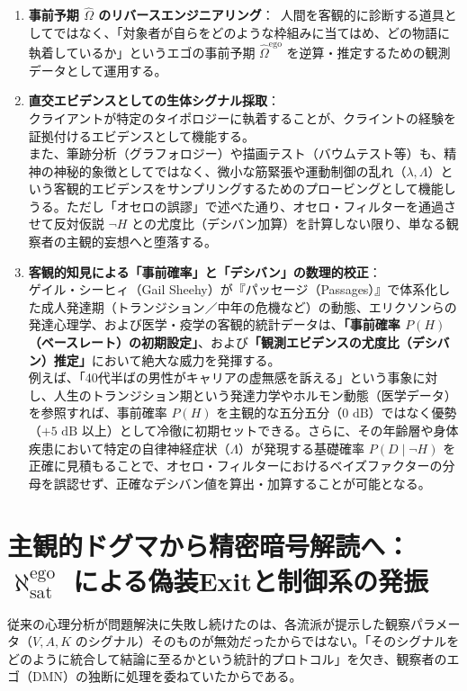 \begin{enumerate}[label=(\arabic*)]
\item \textbf{事前予期 $\hat{\Omega}$ のリバースエンジニアリング}：\
人間を客観的に診断する道具としてではなく、「対象者が自らをどのような枠組みに当てはめ、どの物語に執着しているか」というエゴの事前予期 $\hat{\Omega}^{\mathrm{ego}}$ を逆算・推定するための観測データとして運用する。

\item \textbf{直交エビデンスとしての生体シグナル採取}：\\
クライアントが特定のタイポロジーに執着することが、クライントの経験を証拠付けるエビデンスとして機能する。 \\
また、筆跡分析（グラフォロジー）や描画テスト（バウムテスト等）も、精神の神秘的象徴としてではなく、微小な筋緊張や運動制御の乱れ（$\lambda, \Lambda$）という客観的エビデンスをサンプリングするためのプロービングとして機能しうる。ただし「オセロの誤謬」で述べた通り、オセロ・フィルターを通過させて反対仮説 $\neg H$ との尤度比（デシバン加算）を計算しない限り、単なる観察者の主観的妄想へと堕落する。

\item \textbf{客観的知見による「事前確率」と「デシバン」の数理的校正}：\\
ゲイル・シーヒィ（Gail Sheehy）が『パッセージ（Passages）』で体系化した成人発達期（トランジション／中年の危機など）の動態、エリクソンらの発達心理学、および医学・疫学の客観的統計データは、\textbf{「事前確率 $P(H)$（ベースレート）の初期設定」}、および\textbf{「観測エビデンスの尤度比（デシバン）推定」}において絶大な威力を発揮する。\\
例えば、「40代半ばの男性がキャリアの虚無感を訴える」という事象に対し、人生のトランジション期という発達力学やホルモン動態（医学データ）を参照すれば、事前確率 $P(H)$ を主観的な五分五分（$0\text{ dB}$）ではなく優勢（$+5\text{ dB}$ 以上）として冷徹に初期セットできる。さらに、その年齢層や身体疾患において特定の自律神経症状（$\Lambda$）が発現する基礎確率 $P(D \mid \neg H)$ を正確に見積もることで、オセロ・フィルターにおけるベイズファクターの分母を誤認せず、正確なデシバン値を算出・加算することが可能となる。
\end{enumerate}

\section{主観的ドグマから精密暗号解読へ：$\aleph^{\mathrm{ego}}_{\mathrm{sat}}$ による偽装Exitと制御系の発振}

従来の心理分析が問題解決に失敗し続けたのは、各流派が提示した観察パラメータ（$V, A, K$ のシグナル）そのものが無効だったからではない。「そのシグナルをどのように統合して結論に至るかという統計的プロトコル」を欠き、観察者のエゴ（DMN）の独断に処理を委ねていたからである。

